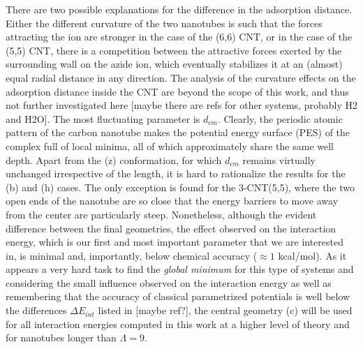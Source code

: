 \documentclass[utf8]{article}
\begin{document}
There are two possible explanations for the difference in the adsorption distance. Either the different curvature of the two nanotubes is such that the forces attracting the ion are stronger in the case of the (6,6) CNT, or in the case of the (5,5) CNT, there is a competition between the attractive forces exerted by the surrounding wall on the azide ion, which eventually stabilizes it at an (almost) equal radial distance in any direction.
The analysis of the curvature effects on the adsorption distance inside the CNT are beyond the scope of this work, and thus not further investigated here [maybe there are refs for other systems, probably H2 and H2O].
The most fluctuating parameter is $d_{cm}$. Clearly, the periodic atomic pattern of the carbon nanotube makes the potential energy surface (PES) of the complex full of local minima, all of which approximately share the same well depth. Apart from the (z) conformation, for which $d_{cm}$ remains virtually unchanged irrespective of the length, it is hard to rationalize the results for the (b) and (h) cases.
The only exception is found for the 3-CNT(5,5), where the two open ends of the nanotube are so close that the energy barriers to move away from the center are particularly steep.
Nonetheless, although the evident difference between the final geometries, the effect observed on the interaction energy, which is our first and most important parameter that we are interested in, is minimal and, importantly, below chemical accuracy ($\approx 1$ kcal/mol).
As it appears a very hard task to find the \emph{global minimum} for this type of systems and considering the small influence observed on the interaction energy as well as remembering that the accuracy of classical parametrized potentials is well below the differences $\Delta E_{int}$ listed in  [maybe ref?], the central geometry (c) will be used for all interaction energies computed in this work at a higher level of theory and for nanotubes longer than $\Lambda = 9$.\\
\end{document}
